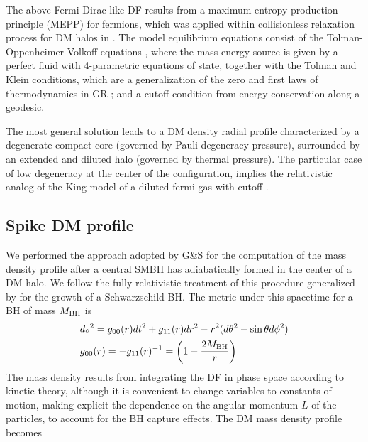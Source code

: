 \documentclass[baaa]{baaa}
\begin{document}
The above Fermi-Dirac-like DF results from a maximum entropy production principle (MEPP) for fermions, which was applied within collisionless relaxation process for DM halos in \citep{chavanis1998degenerate,chavanis2004generalized,chavanis2015models}. 
The model equilibrium equations consist of the Tolman-Oppenheimer-Volkoff equations \citep{Oppenheimer:1939ne}, where the mass-energy source is given by a perfect fluid with 4-parametric equations of state, together with the Tolman and Klein conditions, which are a generalization of the zero and first laws of thermodynamics in GR \citep{1949RvMP...21..531K}; and a cutoff condition from energy conservation along a geodesic. 

The most general solution leads to a DM density radial profile characterized by a degenerate compact core (governed by Pauli degeneracy pressure), surrounded by an extended and diluted halo (governed by thermal pressure). The particular case of low degeneracy at the center of the configuration, implies the relativistic analog of the King model of a diluted fermi gas with cutoff \citep{2023ApJ...945....1K}. 

\subsection{Spike DM profile}\label{subse:adiabatic}

We performed the approach adopted by G\&S for the computation of the mass density profile after a central SMBH has adiabatically formed in the center of a DM halo. We follow the fully relativistic treatment of this procedure generalized by \cite{sadeghian2013dark} for the growth of a Schwarzschild BH. The metric under this spacetime for a BH of mass $M_{\rm BH}$ is
%
\begin{subequations}
    \begin{align}\label{eq:ds2}
    &ds^2 = g_{00}(r) dt^2 +  g_{11}(r) dr^2 - r^2 (d\theta^2 - \sin\theta d\phi^2) \\
    &g_{00}(r) = - g_{11}(r)^{-1} = \left(1-\frac{2M_{\rm BH}}{r}\right)
\end{align}
\end{subequations}
%
The mass density results from integrating the DF in phase space according to kinetic theory, although it is convenient to change variables to constants of motion, making explicit the dependence on the angular momentum $L$ of the particles, to account for the BH capture effects.
The DM mass density profile becomes
\end{document}
